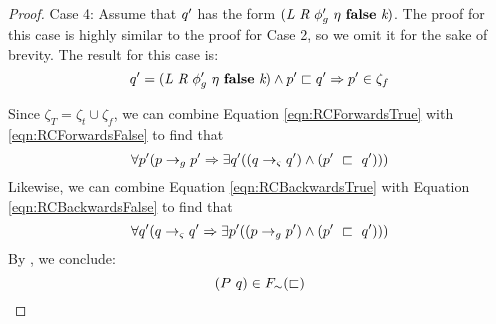 \begin{proof}
Case 4: Assume that $q^\prime$ has the form $\lp \cfgnt{L}\ \cfgnt{R}\ \phi_g^\prime\ \eta\ \cfgt{false}\ \cfgnt{k}\rp $.
The proof for this case is highly similar to the proof for Case 2, so we omit it for the sake of brevity. The result for this case is:
\begin{equation}
\label{eqn:RCBackwardsFalse}
\symst^\prime=\lp \cfgnt{L}\ \cfgnt{R}\ \phi_g^\prime\ \eta\ \cfgt{false}\ \cfgnt{k}\rp \wedge \gsest^\prime \sqsubset \symst^\prime \Rightarrow \gsest^\prime \in \zeta_f
\end{equation}

Since $\zeta_T = \zeta_t \cup \zeta_f$, we can combine Equation \ref{eqn:RCForwardsTrue} with \ref{eqn:RCForwardsFalse} to find that 
\begin{equation}
\forall p^\prime ( p \rightarrow_{g} p^\prime \Rightarrow \exists q^\prime( (q \rightarrow_{\varsigma} q^\prime )\wedge (p^\prime\ \sqsubset\ q^\prime ))  )
\end{equation}
Likewise, we can combine Equation \ref{eqn:RCBackwardsTrue} with Equation \ref{eqn:RCBackwardsFalse} to find that
\begin{equation}
\forall q^\prime ( q \rightarrow_{\varsigma} q^\prime\Rightarrow \exists p^\prime( (p \rightarrow_{g} p^\prime )\wedge (p^\prime\ \sqsubset\ q^\prime ))  )
\end{equation}
By , we conclude:
$$(\Gsest \ \symst) \in F_\sim(\sqsubset)$$
\end{proof}



%



